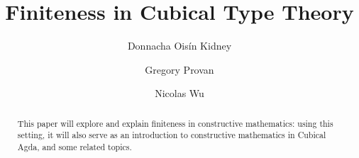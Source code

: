 

\title{Finiteness in Cubical Type Theory}

\author{Donnacha Oisín Kidney}

\author{Gregory Provan}

\author{Nicolas Wu}

\begin{abstract}
  This paper will explore and explain finiteness in constructive mathematics: using this setting, it will also serve as an introduction to constructive mathematics in Cubical Agda, and some related topics.
\end{abstract}

\maketitle



% 



% 





 
